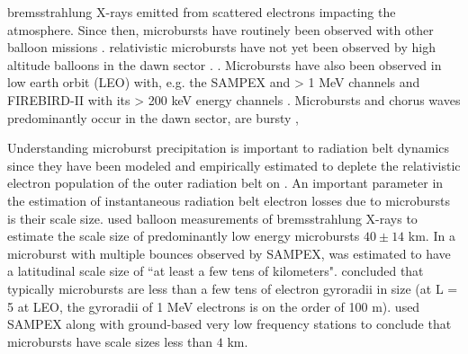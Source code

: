 \documentclass[draft, linenumbers]{agujournal}
\begin{document}
 \citet{Anderson1964}   bremsstrahlung X-rays emitted from scattered  electrons impacting the atmosphere. Since then,  microbursts have routinely been observed with other balloon missions \citep{Parks1967, Woodger2015, Anderson2017}.  relativistic microbursts have not yet been observed by high altitude balloons in the dawn sector \citep{Millan2002, Millan2007}.  \citep{Lee2012}. Microbursts have also been observed in low earth orbit (LEO) with, e.g. the SAMPEX  and > 1 MeV channels \citep{Nakamura1995, Nakamura2000, Blake1996, Lorentzen2001a, Lorentzen2001b, O'Brien2003, O'Brien2004, Blum2015} and FIREBIRD-II with its > 200 keV energy channels \citep{Crew2016, Anderson2017, Breneman2017}. Microbursts and chorus waves predominantly occur in the dawn sector, are bursty \citep{Lorentzen2001b},  

Understanding microburst precipitation is important to radiation belt dynamics since they have been modeled and empirically estimated to deplete the relativistic electron population of the outer radiation belt on  \citep{O'Brien2004, Thorne2005, Shprits2007, Breneman2017}. An important parameter in the estimation of instantaneous radiation belt electron losses due to microbursts is their scale size. \citet{Parks1967} used balloon measurements of bremsstrahlung X-rays to estimate the scale size of predominantly low energy microbursts  $40 \pm 14$ km. In \citet{Blake1996} a microburst with multiple bounces  observed by  SAMPEX,  was estimated to have a latitudinal scale size of ``at least a few tens of kilometers".  concluded that typically microbursts are less than a few tens of electron gyroradii in size (at L = 5 at LEO, the gyroradii of 1 MeV electrons is on the order of 100 m). \citet{Dietrich2010} used SAMPEX along with ground-based very low frequency stations to conclude that microbursts have scale sizes less than $4$ km.
\end{document}
